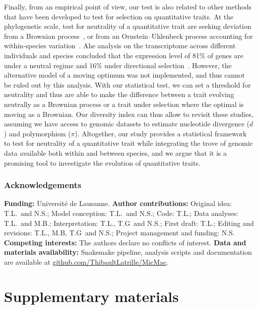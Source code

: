\documentclass{article}
\begin{document}
Finally, from an empirical point of view, our test is also related to other methods that have been developed to test for selection on quantitative traits.
At the phylogenetic scale, test for neutrality of a quantitative trait are seeking deviation from a Brownian process~\cite{catalan_drift_2019}, or from an Ornstein–Uhlenbeck process accounting for within-species variation~\cite{rohlfs_phylogenetic_2015}.
Ahe analysis on the transcriptome across different individuals and species concluded that the expression level of 81\% of genes are under a neutral regime and 16\% under directional selection~\cite{catalan_drift_2019}.
However, the alternative model of a moving optimum was not implemented, and thus cannot be ruled out by this analysis.
With our statistical test, we can set a threshold for neutrality and thus are able to make the difference between a trait evolving neutrally as a Brownian process or a trait under selection where the optimal is moving as a Brownian.
Our diversity index can thus allow to revisit these studies, assuming we have access to genomic datasets to estimate nucleotide divergence ($d$) and polymorphism ($\pi$).
Altogether, our study provides a statistical framework to test for neutrality of a quantitative trait while integrating the trove of genomic data available both within and between species, and we argue that it is a promising tool to investigate the evolution of quantitative traits.

\section*{Acknowledgements}
\label{sec:acknowledgment}
\textbf{Funding:}
Université de Lausanne.
\textbf{Author contributions:}
Original idea: T.L.\ and N.S.;
Model conception: T.L.\ and N.S.;
Code: T.L.;
Data analyses: T.L.\ and M.B.;
Interpretation: T.L., T.G\ and N.S.;
First draft: T.L.;
Editing and revisions: T.L., M.B, T.G\ and N.S.;
Project management and funding: N.S\@.
\textbf{Competing interests:}
The authors declare no conflicts of interest.
\textbf{Data and materials availability:}
Snakemake pipeline, analysis scripts and documentation are available at \href{https://github.com/ThibaultLatrille/MicMac}{github.com/ThibaultLatrille/MicMac}.

\printbibliography

\newpage

\part*{Supplementary materials}
\renewcommand{\thetable}{S\arabic{table}}
\renewcommand{\thefigure}{S\arabic{figure}}
\setcounter{figure}{0}
\setcounter{table}{0}
\setcounter{section}{0}
\end{document}
